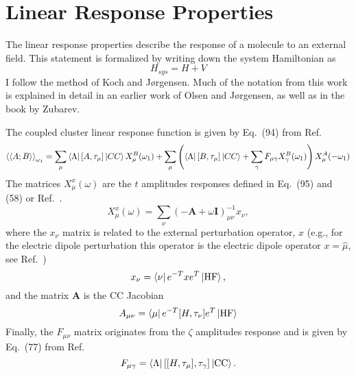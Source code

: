 \documentclass{article}
\begin{document}
\section{Linear Response Properties}
The linear response properties describe the response of a molecule to an
external field. This statement is formalized by writing down the system
Hamiltonian as
\begin{equation}
    H_{sys} = H + V
    \label{eq:H_plus_pert}
\end{equation}
I follow the method of Koch and
J{\o}rgensen.\autocite{kochCoupledClusterResponse1990} Much of the notation from
this work is explained in detail in an earlier work of Olsen and
J{\o}rgensen\autocite{olsenLinearNonlinearResponse1985}, as well as in the book
by Zubarev.\autocite{zubarevNonequilibriumStatisticalThermodynamics1974}

The coupled cluster linear response function is given by Eq.~(94) from
Ref.~\cite{kochCoupledClusterResponse1990}
\begin{equation}
    \expval{\expval{A; B}} _{\omega _1}
    =
    \sum _\mu
        \bra{\Lambda}
            \commutator{A}{\tau _\mu}
        \ket{CC}
        X ^B _\mu (\omega _1)
    +
    \sum _\mu
    \left(
        \bra{\Lambda}
            \commutator{B}{\tau _\mu}
        \ket{CC}
        +
        \sum _\gamma
            F _{\mu \gamma}
            X ^B _\gamma (\omega _1)
    \right)
    X ^A _\mu (-\omega _1)
    \label{eq:lin_res}
\end{equation}
The matrices $X ^x _\mu (\omega)$ are the $t$ amplitudes responses defined in
Eq.~(95) and (58) or Ref.~\cite{kochCoupledClusterResponse1990}.
\begin{equation}
    X ^x _\mu (\omega)
    = 
    \sum _\nu
    (- \mathbf{A} + \omega \mathbf{I}) ^{-1} _{\mu \nu}
    x _\nu,
    \label{eq:t_response}
\end{equation}
where the $x _\nu$ matrix is related to the external perturbation operator,
$x$ (e.g., for the electric dipole perturbation this operator is the electric
dipole operator $x = \hat{\mu}$, see
Ref.~\cite{olsenLinearNonlinearResponse1985})
\begin{equation}
    x _\nu = \bra{\nu}e ^{-T} x e^T \ket{\text{HF}},
    \label{eq:cc_mu}
\end{equation}
and the matrix $\textbf{A}$ is the CC Jacobian
\begin{equation}
    A _{\mu \nu} 
    =
    \bra{\mu}
    e^{-T}
    \commutator{H}{\tau _\nu}
    e ^T
    \ket{\text{HF}}
    \label{eq:cc_jacobian}
\end{equation}
Finally, the $F _{\mu\nu}$ matrix originates from the $\zeta$ amplitudes
response and is given by Eq.~(77) from
Ref.~\cite{kochCoupledClusterResponse1990}
\begin{equation}
    F _{\mu \gamma}
    =
    \bra{\Lambda}
    \commutator{\commutator{H}{\tau _\mu}}{\tau _\gamma}
    \ket{\text{CC}}.
    \label{eq:fmatrix}
\end{equation}
\end{document}
